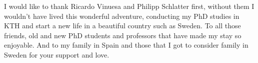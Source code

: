 \begin{acknowledgements}
I would like to thank Ricardo Vinuesa and Philipp Schlatter first, without them I wouldn't have lived this wonderful adventure,
conducting my PhD studies in KTH and start a new life in a beautiful country such as Sweden.
To all those friends, old and new PhD students and professors that have made my stay so enjoyable.
And to my family in Spain and those that I got to consider family in Sweden for your support and love.
\end{acknowledgements}
